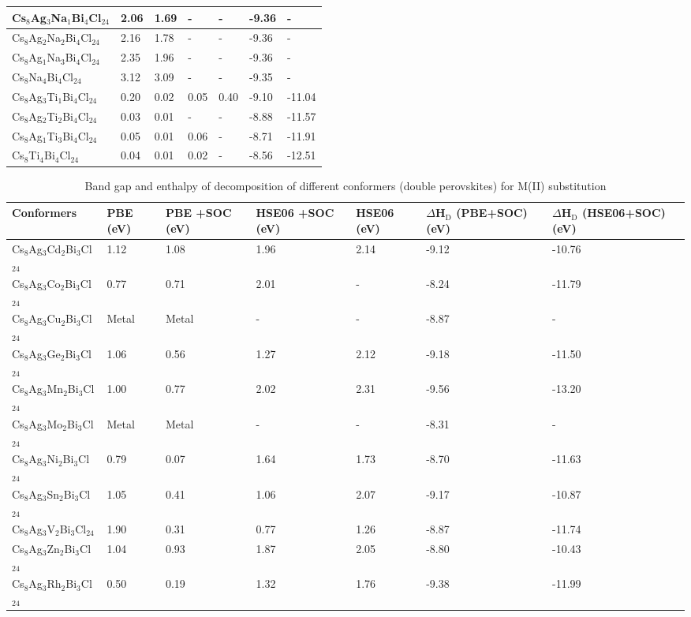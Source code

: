 \documentclass[journal=jpclcd,manuscript=letter]{achemso}
\begin{document}
\begin{table}
\begin{tabular}{p{3.8cm} p{1.2cm}p{1.2cm}p{1.2cm}p{1.2cm}p{2.2cm}p{2.4cm}}
	Cs$_8$Ag$_{3}$Na$_{1}$Bi$_4$Cl$_{24}$ &2.06 & 1.69&-&-& -9.36&-\\ \hline
	Cs$_8$Ag$_{2}$Na$_{2}$Bi$_4$Cl$_{24}$ &2.16&1.78&-&-& -9.36&-\\ \hline
	Cs$_8$Ag$_{1}$Na$_{3}$Bi$_4$Cl$_{24}$&2.35&1.96&-&-& -9.36&-\\ \hline
	Cs$_8$Na$_4$Bi$_4$Cl$_{24}$& 3.12& 3.09&-&-& -9.35 &-\\ \hline
	Cs$_8$Ag$_{3}$Ti$_{1}$Bi$_4$Cl$_{24}$&0.20&0.02&0.05&0.40 & -9.10&	-11.04 \\ \hline
	Cs$_8$Ag$_{2}$Ti$_{2}$Bi$_4$Cl$_{24}$&0.03&0.01&-&-& -8.88&	-11.57
	\\ \hline
	Cs$_8$Ag$_{1}$Ti$_{3}$Bi$_4$Cl$_{24}$&0.05&0.01&0.06&-& -8.71& -11.91\\ \hline
	Cs$_8$Ti$_4$Bi$_4$Cl$_{24}$&0.04& 0.01&0.02&-& -8.56&-12.51\\ \hline		
\end{tabular}
\label{Table2}
\end{table}
\newpage
\begin{table}
\caption{Band gap and enthalpy of decomposition of different conformers (double perovskites) for M(II) substitution} 
\centering
\begin{tabular}{p{3.8cm} p{1.2cm}p{1.2cm}p{1.2cm}p{1.2cm}p{2.2cm}p{2.4cm}} \hline
	Conformers & PBE (eV)& PBE +SOC (eV) & HSE06 +SOC (eV)& HSE06 (eV)& $\Delta$H$_{\textrm{D}}$ (PBE+SOC) (eV) &$\Delta$H$_{\textrm{D}}$ (HSE06+SOC) (eV)\\ \hline			
	Cs$_8$Ag$_{3}$Cd$_{2}$Bi$_{3}$Cl$_{24}$&1.12&1.08&1.96&2.14& -9.12&	-10.76\\ \hline
	Cs$_8$Ag$_{3}$Co$_{2}$Bi$_{3}$Cl$_{24}$&0.77&0.71&2.01&-& -8.24&	-11.79 \\ \hline
	Cs$_8$Ag$_{3}$Cu$_{2}$Bi$_{3}$Cl$_{24}$&Metal&Metal&-&-& -8.87&-
	\\ \hline	
	Cs$_8$Ag$_{3}$Ge$_{2}$Bi$_{3}$Cl$_{24}$&1.06&0.56&1.27&2.12& -9.18&	-11.50\\ \hline
	Cs$_8$Ag$_{3}$Mn$_{2}$Bi$_{3}$Cl$_{24}$&1.00&0.77&2.02&2.31& -9.56&	-13.20
	\\ \hline
	Cs$_8$Ag$_{3}$Mo$_{2}$Bi$_{3}$Cl$_{24}$&Metal&Metal&-&-& -8.31&-
	\\ \hline
	Cs$_8$Ag$_{3}$Ni$_{2}$Bi$_{3}$Cl$_{24}$&0.79&0.07&1.64&1.73& -8.70	&-11.63\\ \hline
	Cs$_8$Ag$_{3}$Sn$_{2}$Bi$_{3}$Cl$_{24}$&1.05&0.41&1.06&2.07& -9.17&	-10.87\\ \hline
	Cs$_8$Ag$_{3}$V$_{2}$Bi$_{3}$Cl$_{24}$&1.90&0.31&0.77&1.26& -8.87&	-11.74\\ \hline
	Cs$_8$Ag$_{3}$Zn$_{2}$Bi$_{3}$Cl$_{24}$&1.04&0.93&1.87&2.05& -8.80&	-10.43\\ \hline
	Cs$_8$Ag$_{3}$Rh$_{2}$Bi$_{3}$Cl$_{24}$&0.50&0.19&1.32&1.76& -9.38&	-11.99\\ \hline
\end{tabular}
\label{Table3}
\end{table}	
\end{document}
